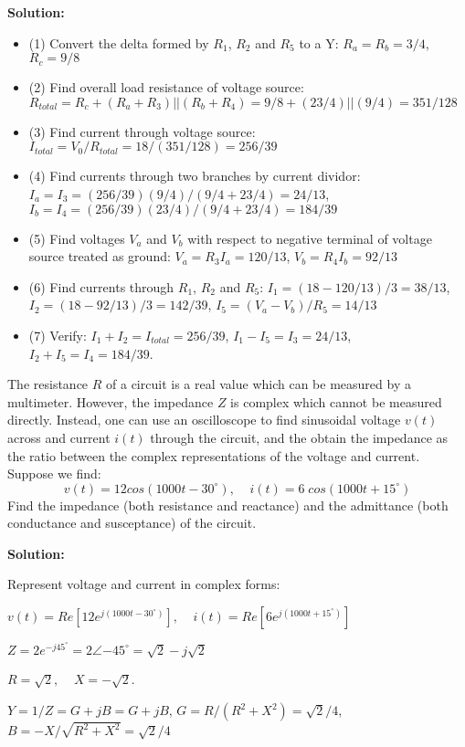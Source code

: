 \begin{enumerate}

{\bf Solution:}
\begin{itemize}
\item (1) Convert the delta formed by $R_1$, $R_2$ and $R_5$ to a Y: 
	$R_a=R_b=3/4$, $R_c=9/8$
\item (2) Find overall load resistance of voltage source:
	$R_{total}=R_c+(R_a+R_3)||(R_b+R_4)=9/8+(23/4)||(9/4)=351/128$
\item (3) Find current through voltage source: 
	$I_{total}=V_0/R_{total}=18/(351/128)=256/39$
\item (4) Find currents through two branches by current dividor:
	$I_a=I_3=(256/39)(9/4)/(9/4+23/4)=24/13$, 
	$I_b=I_4=(256/39)(23/4)/(9/4+23/4)=184/39$
\item (5) Find voltages $V_a$ and $V_b$ with respect to negative terminal of
  voltage source treated as ground: $V_a=R_3 I_a=120/13$, $V_b=R_4 I_b=92/13$
\item (6) Find currents through $R_1$, $R_2$ and $R_5$:
	$I_1=(18-120/13)/3=38/13$, $I_2=(18-92/13)/3=142/39$, 
	$I_5=(V_a-V_b)/R_5=14/13$
\item (7) Verify: $I_1+I_2=I_{total}=256/39$, $I_1-I_5=I_3=24/13$,
	$I_2+I_5=I_4=184/39$.
\end{itemize}

\end{enumerate}


\item The resistance $R$ of a circuit is a real value which can be measured
by a multimeter. However, the impedance $Z$ is complex which cannot be 
measured directly. Instead, one can use an oscilloscope to find sinusoidal 
voltage $v(t)$ across and current $i(t)$ through the circuit, and the obtain
the impedance as the ratio between the complex representations of the voltage
and current. Suppose we find:
\[ v(t)=12 cos(1000t-30^\circ),\;\;\;\; i(t)=6\;cos(1000t+15^\circ) \]
Find the impedance (both resistance and reactance) and the admittance (both
conductance and susceptance) of the circuit.

{\bf Solution:}

Represent voltage and current in complex forms:

$v(t)=Re[12e^{j(1000 t-30^\circ)}],\;\;\;\;i(t)=Re[6e^{j(1000 t+15^\circ)}]$

 $Z=2e^{-j45^\circ}=2\angle{-45^\circ}=\sqrt{2}-j\sqrt{2}$

 $R=\sqrt{2},\;\;\;\;X=-\sqrt{2}$.

 $Y=1/Z=G+jB=G+jB$, $G=R/(R^2+X^2)=\sqrt{2}/4$, 
	$B=-X/\sqrt{R^2+X^2}=\sqrt{2}/4$

